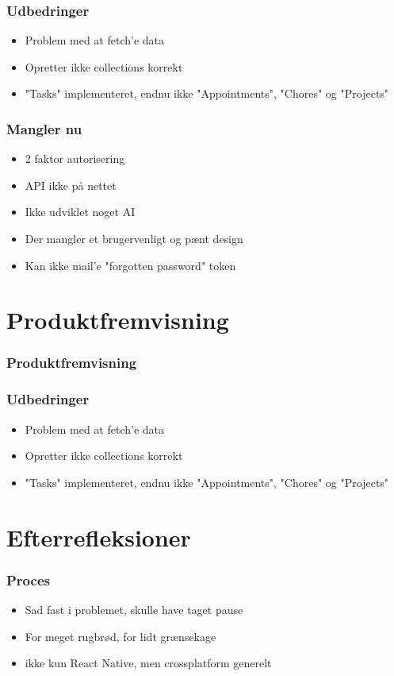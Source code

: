 \documentclass[xcolor={dvipsnames}]{beamer}
\begin{document}
\begin{frame}
\frametitle{Udbedringer}
\begin{itemize}
\item Problem med at fetch'e data
\item Opretter ikke collections korrekt
\item "Tasks" implementeret, endnu ikke "Appointments", "Chores" og "Projects" 
\end{itemize}
\end{frame}

\begin{frame}
\frametitle{Mangler nu}
\begin{itemize}
\item 2 faktor autorisering
\item API ikke på nettet
\item Ikke udviklet noget AI 
\item Der mangler et brugervenligt og pænt design
\item Kan ikke mail'e "forgotten password" token
\end{itemize}
\end{frame}

\section{Produktfremvisning}

\begin{frame}
\frametitle{Produktfremvisning}
\end{frame}

\begin{frame}
\frametitle{Udbedringer}
\begin{itemize}
\item Problem med at fetch'e data
\item Opretter ikke collections korrekt
\item "Tasks" implementeret, endnu ikke "Appointments", "Chores" og "Projects" 
\end{itemize}
\end{frame}

\section{Efterrefleksioner}

\begin{frame}
\frametitle{Proces}
\begin{itemize}
\item Sad fast i problemet, skulle have taget pause
\item For meget rugbrød, for lidt grænsekage
\item ikke kun React Native, men crossplatform generelt
\end{itemize}
\end{frame}
\end{document}
